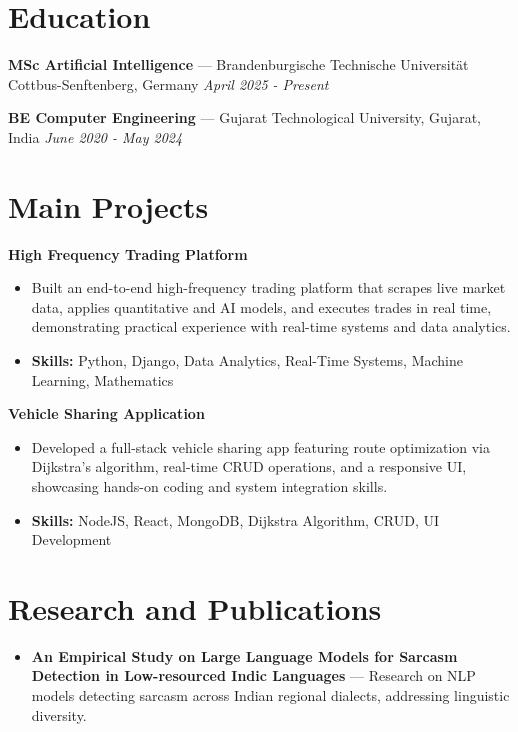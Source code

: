 \documentclass[a4paper,10pt]{article}
\begin{document}
\section*{Education}
\textbf{MSc Artificial Intelligence} — Brandenburgische Technische Universität Cottbus-Senftenberg, Germany \hfill \textit{April 2025 - Present}\par
\vspace{1.5pt}
\textbf{BE Computer Engineering} — Gujarat Technological University, Gujarat, India \hfill \textit{June 2020 - May 2024}\par

\section*{Main Projects}
\textbf{High Frequency Trading Platform}\par
\vspace{1pt}
\begin{itemize}
  \item Built an end-to-end high-frequency trading platform that scrapes live market data, applies quantitative and AI models, and executes trades in real time, demonstrating practical experience with real-time systems and data analytics.
  \item \textbf{Skills:} Python, Django, Data Analytics, Real-Time Systems, Machine Learning, Mathematics
\end{itemize}
\vspace{3pt}
\textbf{Vehicle Sharing Application}\par
\vspace{1pt}
\begin{itemize}
  \item Developed a full-stack vehicle sharing app featuring route optimization via Dijkstra's algorithm, real-time CRUD operations, and a responsive UI, showcasing hands-on coding and system integration skills.
  \item \textbf{Skills:} NodeJS, React, MongoDB, Dijkstra Algorithm, CRUD, UI Development
\end{itemize}

\section*{Research and Publications}
\begin{itemize}
\item \textbf{An Empirical Study on Large Language Models for Sarcasm Detection in Low-resourced Indic Languages} — Research on NLP models detecting sarcasm across Indian regional dialects, addressing linguistic diversity.
\end{itemize}
\end{document}
